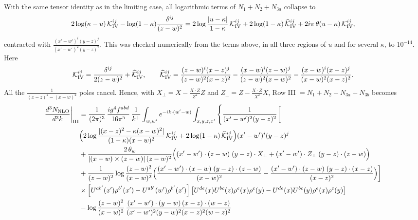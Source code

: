 \documentclass[9pt]{article}
\numberwithin{equation}{section}
\begin{document}
{\begin{itemize}
\end{itemize}
With the same tensor identity as in the limiting case, all logarithmic terms of $N_{1}+N_{2}+N_{3a}$ collapse to
\begin{align}
2\log(\kappa-u)\,\mathcal K^{ij}_{\rm IV}-\log(1-\kappa)\frac{\delta^{ij}}{(z-w)^{2}}
=2\log\frac{|u-\kappa|}{1-\kappa}\,\mathcal K^{ij}_{\rm IV}+2\log(1-\kappa)\,\widehat{\mathcal K}^{ij}_{\rm IV}+2i\pi\,\theta(u-\kappa)\,\mathcal K^{ij}_{\rm IV},
\end{align}
contracted with $\frac{(x'-w')^{i}(y-z)^{j}}{(x'-w')^{2}(y-z)^{2}}$. This was checked numerically from the terms above, in all three regions of $u$ and for several $\kappa$, to $10^{-14}$. Here
\begin{equation}
\mathcal K^{ij}_{\rm IV}=\frac{\delta^{ij}}{2(z-w)^{2}}+\widehat{\mathcal K}^{ij}_{\rm IV},\qquad
\widehat{\mathcal K}^{ij}_{\rm IV}=\frac{(z-w)^{i}(x-z)^{j}}{(z-w)^{2}(x-z)^{2}}-\frac{(x-w)^{i}(z-w)^{j}}{(z-w)^{2}(x-w)^{2}}-\frac{(x-w)^{i}(x-z)^{j}}{(x-w)^{2}(x-z)^{2}}.
\end{equation}
All the $\frac{1}{(x-z)^{2}-(x-w)^{2}}$ poles cancel. Hence, with $X_{\perp}=X-\frac{X\cdot Z}{Z^{2}}Z$ and $Z_{\perp}=Z-\frac{X\cdot Z}{X^{2}}X$, Row III $=N_{1}+N_{2}+N_{3a}+N_{3b}$ becomes
\begin{align}
\frac{d^{3}N_{\rm NLO}}{d^{3}k}\bigg|_{\rm III}&=\frac{1}{(2\pi)^{3}}\,\frac{ig^{4}f^{abd}}{16\pi^{5}}\,\frac{1}{k^{+}}\int_{w,w'}e^{-ik\cdot(w'-w)}\int_{x,y,z,x'}\Bigg\{\frac{1}{(x'-w')^{2}(y-z)^{2}}\bigg[\notag\\
&\Big(2\log\frac{|(x-z)^{2}-\kappa(x-w)^{2}|}{(1-\kappa)(x-w)^{2}}\,\mathcal K^{ij}_{\rm IV}+2\log(1-\kappa)\,\widehat{\mathcal K}^{ij}_{\rm IV}\Big)(x'-w')^{i}(y-z)^{j}\notag\\
&+\frac{2\,\theta_{w}}{|(x-w)\times(z-w)|\,(z-w)^{2}}\Big((x'-w')\cdot(z-w)\;(y-z)\cdot X_{\perp}+(x'-w')\cdot Z_{\perp}\;(y-z)\cdot(z-w)\Big)\notag\\
&+\frac{1}{(z-w)^{2}}\log\frac{(z-w)^{2}}{(x-w)^{2}}\Big(\frac{(x'-w')\cdot(x-w)\;(y-z)\cdot(z-w)}{(x-w)^{2}}-\frac{(x'-w')\cdot(z-w)\;(y-z)\cdot(x-z)}{(x-z)^{2}}\Big)\bigg]\notag\\
&\times\left[U^{ab'}(x')\rho^{b'}(x')-U^{ab'}(w')\rho^{b'}(x')\right]\left[U^{de}(x)U^{bc}(z)\rho^{e}(x)\rho^{c}(y)-U^{de}(x)U^{bc}(y)\rho^{e}(x)\rho^{c}(y)\right]\notag\\
&-\log\frac{(z-w)^{2}}{(x-w)^{2}}\,\frac{(x'-w')\cdot(y-w)\,(x-z)\cdot(w-z)}{(x'-w')^{2}(y-w)^{2}(x-z)^{2}(w-z)^{2}}\notag\\

\end{align}}
\end{document}
